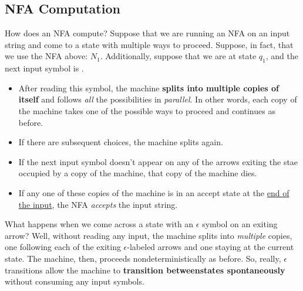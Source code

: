\documentclass[letterpaper]{article}
\begin{document}
\subsection{NFA Computation}
How does an NFA compute? Suppose that we are running an NFA on an input string and come to a state with multiple ways to proceed. Suppose, in fact, that we use the NFA above: $N_1$. Additionally, suppose that we are at state $q_1$, and the next input symbol is . 
\begin{itemize}
    \item After reading this symbol, the machine \textbf{splits into multiple copies of itself} and follows \emph{all} the possibilities in \emph{parallel}. In other words, each copy of the machine takes one of the possible ways to proceed and continues as before. 
    \item If there are subsequent choices, the machine splits again. 
    \item If the next input symbol doesn't appear on any of the arrows exiting the stae occupied by a copy of the machine, that copy of the machine dies.
    \item If any one of these copies of the machine is in an accept state at the \underline{end of the input}, the NFA \emph{accepts} the input string.
\end{itemize}
What happens when we come across a state with an $\epsilon$ symbol on an exiting arrow? Well, without reading any input, the machine splits into \emph{multiple} copies, one following each of the exiting $\epsilon$-labeled arrows and one staying at the current state. The machine, then, proceeds nondeterministically as before. So, really, $\epsilon$ transitions allow the machine to \textbf{transition betweenstates spontaneously} without consuming any input symbols.
\end{document}
